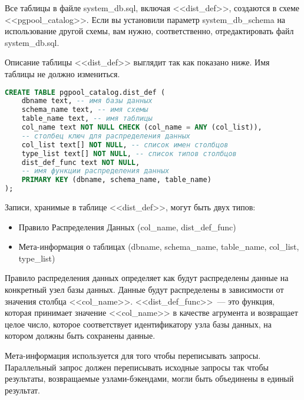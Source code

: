 Все таблицы в файле system\_db.sql, включая <<dist\_def>>, создаются в схеме <<pgpool\_catalog>>. Если вы установили 
параметр system\_db\_schema на использование другой схемы, вам нужно, соответственно, отредактировать файл system\_db.sql.

Описание таблицы <<dist\_def>> выглядит так как показано ниже. Имя таблицы не должно измениться.
\begin{lstlisting}[language=SQL,label=lst:pgpool31,caption=Создание таблицы dist\_def]
CREATE TABLE pgpool_catalog.dist_def (
    dbname text, -- имя базы данных
    schema_name text, -- имя схемы
    table_name text, -- имя таблицы
    col_name text NOT NULL CHECK (col_name = ANY (col_list)), 
    -- столбец ключ для распределения данных
    col_list text[] NOT NULL, -- список имен столбцов
    type_list text[] NOT NULL, -- список типов столбцов
    dist_def_func text NOT NULL, 
    -- имя функции распределения данных
    PRIMARY KEY (dbname, schema_name, table_name)
);
\end{lstlisting}

Записи, хранимые в таблице <<dist\_def>>, могут быть двух типов:
\begin{itemize}
\item Правило Распределения Данных (col\_name, dist\_def\_func)
\item Мета-информация о таблицах (dbname, schema\_name, table\_name, col\_list, type\_list)
\end{itemize}

Правило распределения данных определяет как будут распределены данные на конкретный узел базы данных. Данные будут 
распределены в зависимости от значения столбца <<col\_name>>. <<dist\_def\_func>>~--- это функция, которая принимает 
значение <<col\_name>> в качестве агрумента и возвращает целое число, которое соответствует идентификатору узла 
базы данных, на котором должны быть сохранены данные.

Мета-информация используется для того чтобы переписывать запросы. Параллельный запрос должен переписывать исходные запросы 
так чтобы результаты, возвращаемые узлами-бэкендами, могли быть объединены в единый результат.


